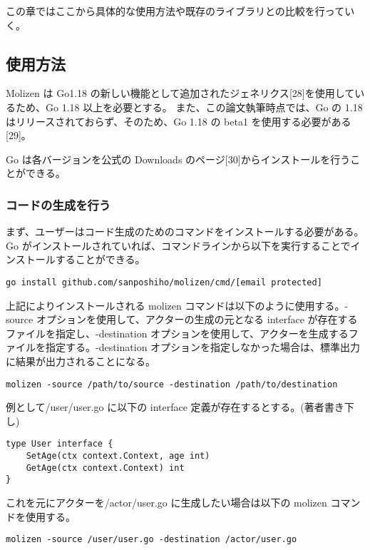 この章ではここから具体的な使用方法や既存のライブラリとの比較を行っていく。

\subsection{使用方法}

Molizen は Go1.18
の新しい機能として追加されたジェネリクス{[}28{]}を使用しているため、Go
1.18 以上を必要とする。 また、この論文執筆時点では、Go の 1.18
はリリースされておらず、そのため、Go 1.18 の beta1
を使用する必要がある{[}29{]}。

Go は各バージョンを公式の Downloads
のページ{[}30{]}からインストールを行うことができる。

\subsubsection{コードの生成を行う}

まず、ユーザーはコード生成のためのコマンドをインストールする必要がある。Go
がインストールされていれば、コマンドラインから以下を実行することでインストールすることができる。

\begin{verbatim}
go install github.com/sanposhiho/molizen/cmd/[email protected]
\end{verbatim}

上記によりインストールされる molizen
コマンドは以下のように使用する。-source
オプションを使用して、アクターの生成の元となる interface
が存在するファイルを指定し、-destination
オプションを使用して、アクターを生成するファイルを指定する。-destination
オプションを指定しなかった場合は、標準出力に結果が出力されることになる。

\begin{verbatim}
molizen -source /path/to/source -destination /path/to/destination
\end{verbatim}

例として/user/user.go に以下の interface
定義が存在するとする。(著者書き下し)

\begin{verbatim}
type User interface {
    SetAge(ctx context.Context, age int)
    GetAge(ctx context.Context) int
}
\end{verbatim}

これを元にアクターを/actor/user.go に生成したい場合は以下の molizen
コマンドを使用する。

\begin{verbatim}
molizen -source /user/user.go -destination /actor/user.go
\end{verbatim}

